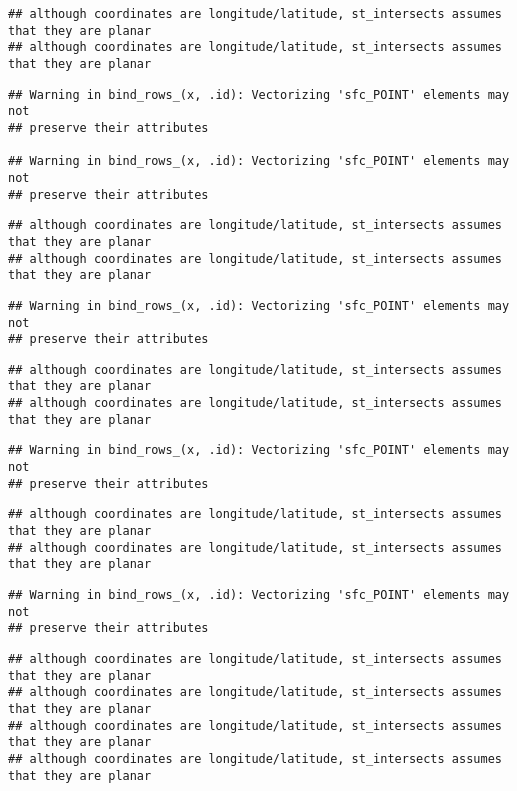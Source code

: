\documentclass[]{article}
\begin{document}
\begin{verbatim}
## although coordinates are longitude/latitude, st_intersects assumes that they are planar
## although coordinates are longitude/latitude, st_intersects assumes that they are planar
\end{verbatim}

\begin{verbatim}
## Warning in bind_rows_(x, .id): Vectorizing 'sfc_POINT' elements may not
## preserve their attributes

## Warning in bind_rows_(x, .id): Vectorizing 'sfc_POINT' elements may not
## preserve their attributes
\end{verbatim}

\begin{verbatim}
## although coordinates are longitude/latitude, st_intersects assumes that they are planar
## although coordinates are longitude/latitude, st_intersects assumes that they are planar
\end{verbatim}

\begin{verbatim}
## Warning in bind_rows_(x, .id): Vectorizing 'sfc_POINT' elements may not
## preserve their attributes
\end{verbatim}

\begin{verbatim}
## although coordinates are longitude/latitude, st_intersects assumes that they are planar
## although coordinates are longitude/latitude, st_intersects assumes that they are planar
\end{verbatim}

\begin{verbatim}
## Warning in bind_rows_(x, .id): Vectorizing 'sfc_POINT' elements may not
## preserve their attributes
\end{verbatim}

\begin{verbatim}
## although coordinates are longitude/latitude, st_intersects assumes that they are planar
## although coordinates are longitude/latitude, st_intersects assumes that they are planar
\end{verbatim}

\begin{verbatim}
## Warning in bind_rows_(x, .id): Vectorizing 'sfc_POINT' elements may not
## preserve their attributes
\end{verbatim}

\begin{verbatim}
## although coordinates are longitude/latitude, st_intersects assumes that they are planar
## although coordinates are longitude/latitude, st_intersects assumes that they are planar
## although coordinates are longitude/latitude, st_intersects assumes that they are planar
## although coordinates are longitude/latitude, st_intersects assumes that they are planar
\end{verbatim}
\end{document}
